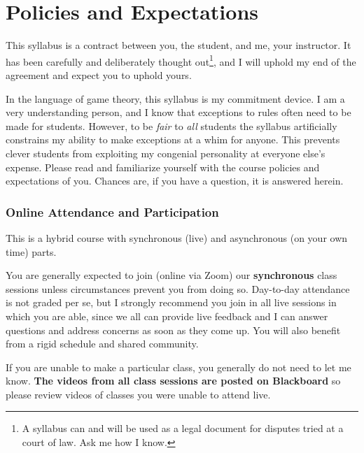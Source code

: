\documentclass{article}
\begin{document}
\hypertarget{policies-and-expectations}{%
\section*{Policies and Expectations}\label{policies-and-expectations}}

This syllabus is a contract between you, the student, and me, your
instructor. It has been carefully and deliberately thought out\footnote{A
  syllabus can and will be used as a legal document for disputes tried
  at a court of law. Ask me how I know.}, and I will uphold my end of
the agreement and expect you to uphold yours.

In the language of game theory, this syllabus is my commitment device. I
am a very understanding person, and I know that exceptions to rules
often need to be made for students. However, to be \emph{fair} to
\emph{all} students the syllabus artificially constrains my ability to
make exceptions at a whim for anyone. This prevents clever students from
exploiting my congenial personality at everyone else's expense. Please
read and familiarize yourself with the course policies and expectations
of you. Chances are, if you have a question, it is answered herein.

\hypertarget{online-attendance-and-participation}{%
\subsubsection*{Online Attendance and
Participation}\label{online-attendance-and-participation}}

This is a hybrid course with synchronous (live) and asynchronous (on
your own time) parts.

You are generally expected to join (online via Zoom) our
\textbf{synchronous} class sessions unless circumstances prevent you
from doing so. Day-to-day attendance is not graded per se, but I
strongly recommend you join in all live sessions in which you are able,
since we all can provide live feedback and I can answer questions and
address concerns as soon as they come up. You will also benefit from a
rigid schedule and shared community.

If you are unable to make a particular class, you generally do not need
to let me know. \textbf{The videos from all class sessions are posted on
Blackboard} so please review videos of classes you were unable to attend
live.
\end{document}
